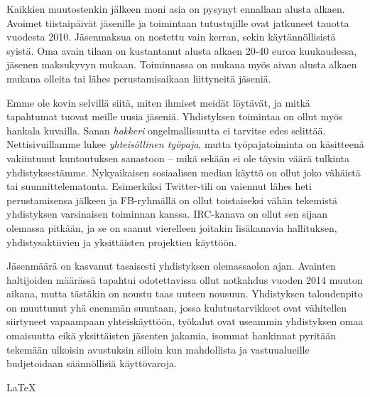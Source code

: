 \documentclass[a4paper]{memoir}
\begin{document}
Kaikkien muutostenkin jälkeen moni asia on pysynyt ennallaan alusta alkaen. Avoimet tiistaipäivät jäsenille ja toimintaan tutustujille ovat jatkuneet tauotta vuodesta 2010. Jäsenmaksua on nostettu vain kerran, sekin käytännöllisistä syistä. Oma avain tilaan on kustantanut alusta alkaen 20-40 euroa kuukaudessa, jäsenen maksukyvyn mukaan. Toiminnassa on mukana myös aivan alusta alkaen mukana olleita tai lähes perustamisaikaan liittyneitä jäseniä. 

Emme ole kovin selvillä siitä, miten ihmiset meidät löytävät, ja mitkä tapahtumat tuovat meille uusia jäseniä. Yhdistyksen toimintaa on ollut myös hankala kuvailla. Sanan \textit{hakkeri} ongelmallisuutta ei tarvitse edes selittää. Nettisivuillamme lukee \textit{yhteisöllinen työpaja}, mutta työpajatoiminta on käsitteenä vakiintunut kuntoutuksen sanastoon -- mikä sekään ei ole täysin väärä tulkinta yhdistyksestämme. Nykyaikaisen sosiaalisen median käyttö on ollut joko vähäistä tai suunnittelematonta. Esimerkiksi Twitter-tili on vaiennut lähes heti perustamisensa jälkeen ja FB-ryhmällä on ollut toistaiseksi vähän tekemistä yhdistyksen varsinaisen toiminnan kanssa. IRC-kanava on ollut sen sijaan olemassa pitkään, ja se on saanut vierelleen joitakin lisäkanavia hallituksen, yhdistysaktiivien ja yksittäisten projektien käyttöön.

Jäsenmäärä on kasvanut tasaisesti yhdistyksen olemassaolon ajan. Avainten haltijoiden määrässä tapahtui odotettavissa ollut notkahdus vuoden 2014 muuton aikana, mutta tästäkin on noustu taas uuteen nousuun. Yhdistyksen taloudenpito on muuttunut yhä enemmän suuntaan, jossa kulutustarvikkeet ovat vähitellen siirtyneet vapaampaan yhteiskäyttöön, työkalut ovat useammin yhdistyksen omaa omaisuutta eikä yksittäisten jäsenten jakamia, isommat hankinnat pyritään tekemään ulkoisin avustuksin silloin kun mahdollista ja vastuualueille budjetoidaan säännöllisiä käyttövaroja.

\vfill

\LaTeX
 
\end{document}
